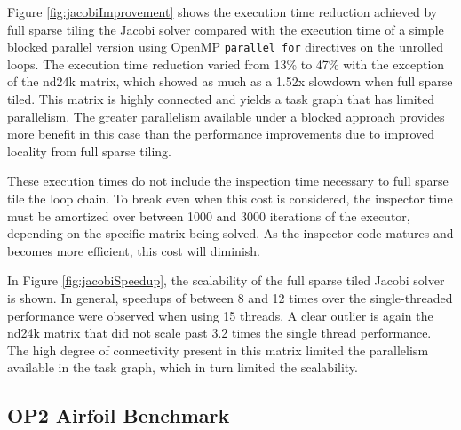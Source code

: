 Figure \ref{fig:jacobiImprovement} shows the execution time reduction achieved by full sparse tiling the Jacobi solver  compared with the execution time of a simple blocked parallel version using OpenMP \texttt{parallel for} directives on the unrolled loops. The execution time reduction varied from 13\% to 47\% with the exception of the nd24k matrix, which showed as much as a 1.52x slowdown when full sparse tiled. This matrix is highly connected and yields a task graph that has limited parallelism. The greater parallelism available under a blocked approach provides more benefit in this case than the performance improvements due to improved locality from full sparse tiling.

These execution times do not include the inspection time necessary to full sparse tile the loop chain. To break even when this cost is considered, the inspector time must be amortized over between 1000 and 3000 iterations of the executor, depending on the specific matrix being solved. As the inspector code matures and becomes more efficient, this cost will diminish.

In Figure \ref{fig:jacobiSpeedup},  the scalability of the full sparse tiled Jacobi solver is shown. In general, speedups of between 8 and 12 times over the single-threaded performance were observed when using 15 threads. A clear outlier is again the nd24k matrix that did not scale past 3.2 times the single thread performance. The high degree of connectivity present in this matrix limited the parallelism available in the task graph, which in turn limited the scalability.

\subsection{OP2 Airfoil Benchmark}

